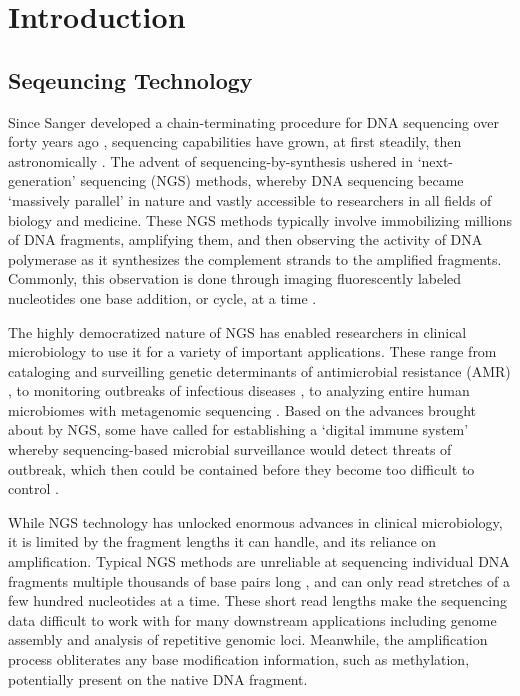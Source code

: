 \chapter{Introduction}
\label{chap:intro}

\section{Seqeuncing Technology}
\label{sec:seq}
Since Sanger developed a chain-terminating procedure for DNA sequencing over forty years ago \citep{Sanger1977-lo}, sequencing capabilities have grown, at first steadily, then astronomically \citep{Schatz2013-vw}. The advent of sequencing-by-synthesis ushered in ‘next-generation’ sequencing (NGS) methods, whereby DNA sequencing became ‘massively parallel’ in nature and vastly accessible to researchers in all fields of biology and medicine. These NGS methods typically involve immobilizing millions of DNA fragments, amplifying them, and then observing the activity of DNA polymerase as it synthesizes the complement strands to the amplified fragments. Commonly, this observation is done through imaging fluorescently labeled nucleotides one base addition, or cycle, at a time \citep{Shendure2017-oy}.

The highly democratized nature of NGS has enabled researchers in clinical microbiology to use it for a variety of important applications. These range from cataloging and surveilling genetic determinants of antimicrobial resistance (AMR) \citep{Crofts2017-ni, Canica2019-ho, Toth2020-ov, Thanner2016-wy, Hendriksen2019-qi}, to monitoring outbreaks of infectious diseases \citep{Dipaola2020-bw, Lu2020-ti}, to analyzing entire human microbiomes with metagenomic sequencing \citep{Chiu2019-cg}. Based on the advances brought about by NGS, some have called for establishing a ‘digital immune system’ whereby sequencing-based microbial surveillance would detect threats of outbreak, which then could be contained before they become too difficult to control \citep{Schatz2012-ow}.

While NGS technology has unlocked enormous advances in clinical microbiology, it is limited by the fragment lengths it can handle, and its reliance on amplification. Typical NGS methods are unreliable at sequencing individual DNA fragments multiple thousands of base pairs long \citep{Heather2016-wb}, and can only read stretches of a few hundred nucleotides at a time. These short read lengths make the sequencing data difficult to work with for many downstream applications including genome assembly and analysis of repetitive genomic loci. Meanwhile, the amplification process obliterates any base modification information, such as methylation, potentially present on the native DNA fragment.

